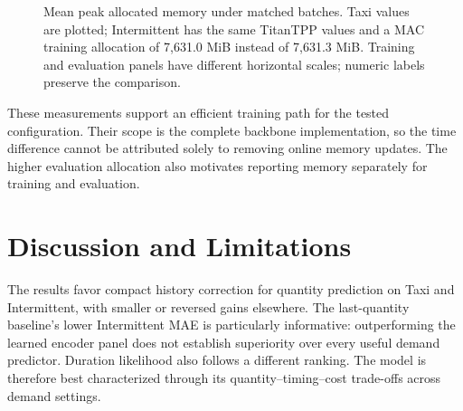 \documentclass[runningheads]{llncs}
\providecommand{\Description}[1]{}
\begin{document}
\begin{figure}[t]
\centering
{}
\Description{Two paired horizontal bar panels compare allocated GPU memory.
Training uses about 7631 MiB for MAC and 1870 MiB for TitanTPP. Evaluation
uses 97.8 MiB for MAC and 389.2 MiB for TitanTPP. The evaluation panel has an
expanded scale and all bars carry numeric labels.}
\caption{Mean peak allocated memory under matched batches. Taxi values
are plotted; Intermittent has the same TitanTPP values and a MAC training
allocation of 7,631.0 MiB instead of 7,631.3 MiB. Training and evaluation
panels have different horizontal scales; numeric labels preserve the
comparison.}
\label{fig:memory}
\end{figure}

These measurements support an efficient training path for the tested
configuration. Their scope is the complete backbone implementation, so the
time difference cannot be attributed solely to removing online memory
updates. The higher evaluation allocation also motivates reporting memory
separately for training and evaluation.

\section{Discussion and Limitations}\label{sec:limitations}
The results favor compact history correction for quantity prediction on Taxi
and Intermittent, with smaller or reversed gains elsewhere. The last-quantity
baseline's lower Intermittent MAE is particularly informative: outperforming
the learned encoder panel does not establish superiority over every useful
demand predictor. Duration likelihood also follows a different ranking.
The model is therefore best characterized through its quantity--timing--cost
trade-offs across demand settings.
\end{document}
